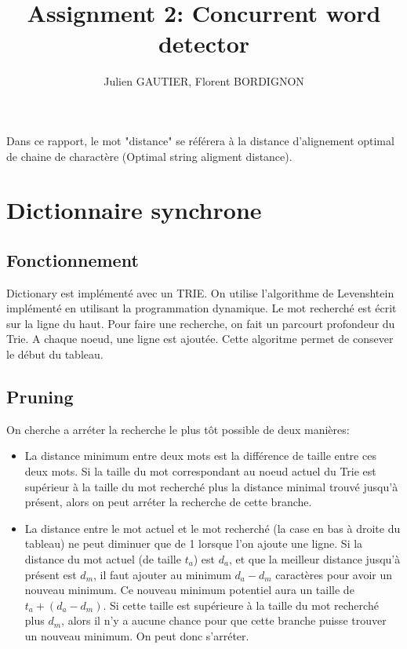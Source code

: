 \documentclass{article}
\title{Assignment 2: Concurrent word detector}
\author{Julien GAUTIER, Florent BORDIGNON}
\begin{document}
\maketitle
Dans ce rapport, le mot "distance" se référera à la distance
d'alignement optimal de chaine de charactère (Optimal string aligment
distance).

\section{Dictionnaire synchrone}
\subsection{Fonctionnement}
Dictionary est implémenté avec un TRIE.
On utilise l'algorithme de Levenshtein implémenté en utilisant la
programmation dynamique.
Le mot recherché est écrit sur la ligne du haut.
Pour faire une recherche, on fait un parcourt profondeur du Trie.  A
chaque noeud, une ligne est ajoutée.
Cette algoritme permet de consever le début du tableau.\\



\subsection{Pruning}
On cherche a arréter la recherche le plus tôt possible de deux manières:
\begin{itemize}
\item La distance minimum entre deux mots est la différence de taille
  entre ces deux mots.
Si la taille du mot correspondant au noeud actuel du Trie est supérieur
à la taille du mot recherché plus la distance minimal trouvé jusqu'à
présent, alors on peut arréter la recherche de cette branche.
\item La distance entre le mot actuel et le mot recherché (la case en
  bas à droite du tableau) ne peut diminuer que de 1 lorsque l'on ajoute
  une ligne.
Si la distance du mot actuel (de taille $t_a$) est $d_a$, et que la
meilleur distance jusqu'à présent est $d_m$, il faut ajouter au minimum
$d_a - d_m$ caractères pour avoir un nouveau minimum.
Ce nouveau minimum potentiel aura un taille de $t_a + (d_a - d_m)$.
Si cette taille est supérieure à la taille du mot recherché plus $d_m$,
alors il n'y a aucune chance pour que cette branche puisse trouver un
nouveau minimum.
On peut donc s'arréter.
\end{itemize}
\end{document}

